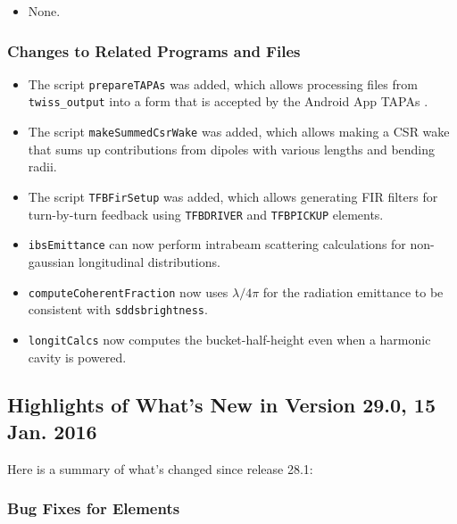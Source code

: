 \documentclass[11pt]{article}
\begin{document}
\begin{itemize}
\item None.
\end{itemize}

\subsubsection{Changes to Related Programs and Files}

\begin{itemize}
\item The script \verb|prepareTAPAs| was added, which allows processing files from \verb|twiss_output| into a form
  that is accepted by the Android App TAPAs \cite{TAPAs}.
\item The script \verb|makeSummedCsrWake| was added, which allows making a CSR wake that sums up contributions from
  dipoles with various lengths and bending radii. 
\item The script \verb|TFBFirSetup| was added, which allows generating FIR filters for turn-by-turn feedback using 
  \verb|TFBDRIVER| and \verb|TFBPICKUP| elements.
\item \verb|ibsEmittance| can now perform intrabeam scattering calculations for non-gaussian longitudinal distributions.
\item \verb|computeCoherentFraction| now uses $\lambda/4\pi$ for the radiation emittance to be consistent with 
  \verb|sddsbrightness|.
\item \verb|longitCalcs| now computes the bucket-half-height even when a harmonic cavity is powered.
\end{itemize}

\subsection{Highlights of What's New in Version 29.0, 15 Jan. 2016}

Here is a summary of what's changed since release 28.1:

\subsubsection{Bug Fixes for Elements}
\end{document}
